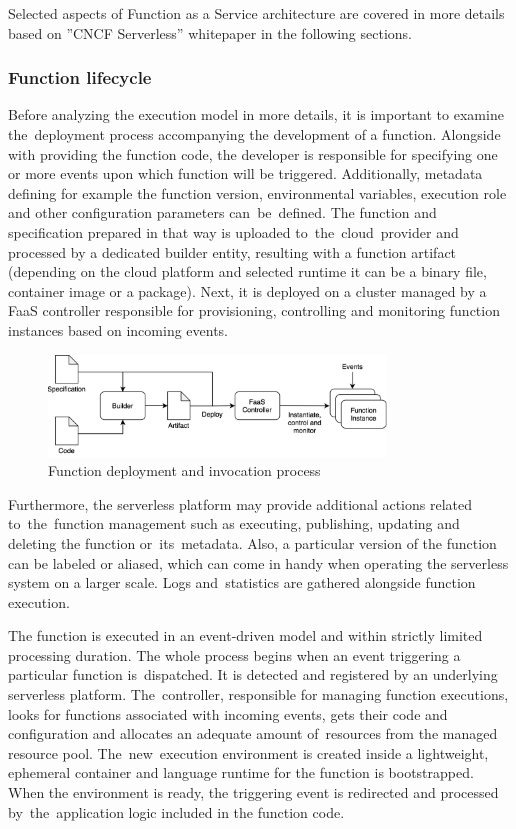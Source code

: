 Selected aspects of Function as a Service architecture are covered in more details based on ''CNCF Serverless'' whitepaper \cite{CNCFServerless} in the following sections.

\subsubsection{Function lifecycle}

Before analyzing the execution model in more details, it is important to examine the~deployment process accompanying the development of a function. Alongside with providing the function code, the developer is responsible for specifying one or more events upon which function will be triggered. Additionally, metadata defining for example the function version, environmental variables, execution role and other configuration parameters can~be~defined. The function and specification prepared in that way is uploaded to~the~cloud~provider and processed by a dedicated builder entity, resulting with a function artifact (depending on the cloud platform and selected runtime it can be a binary file, container image or a package). Next, it is deployed on a cluster managed by a FaaS controller responsible for provisioning, controlling and monitoring function instances based on incoming events.

\begin{figure}[h]
    \centering
    \includegraphics[width=0.8\textwidth]{assets/02-serverless/ServerlessDeployment.png}
    \caption{Function deployment and invocation process}
    \label{fig:function-deployment-and-invocation-process}
\end{figure}

Furthermore, the serverless platform may provide additional actions related to~the~function management such as executing, publishing, updating and deleting the function or~its~metadata. Also, a particular version of the function can be labeled or aliased, which can come in handy when operating the serverless system on a larger scale. Logs and~statistics are gathered alongside function execution.

The function is executed in an event-driven model and within strictly limited processing duration. The whole process begins when an event triggering a particular function is~dispatched. It is detected and registered by an underlying serverless platform. The~controller, responsible for managing function executions, looks for functions associated with incoming events, gets their code and configuration and allocates an adequate amount of~resources from the managed resource pool. The~new~execution environment is created inside a lightweight, ephemeral container and language runtime for the function is bootstrapped. When the environment is ready, the triggering event is redirected and processed by~the~application logic included in the function code.

